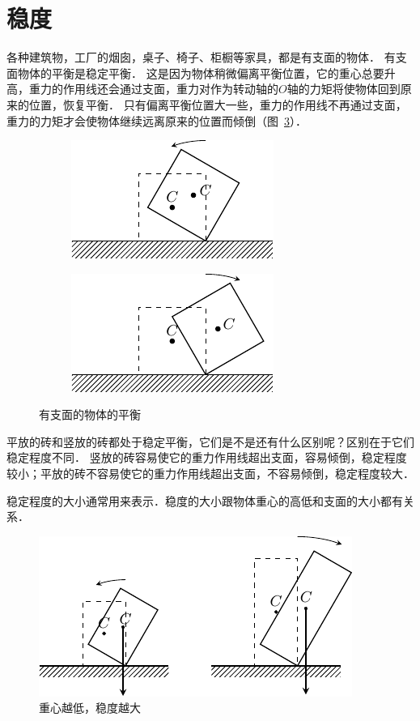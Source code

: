 \section{稳度}
各种建筑物，工厂的烟囱，桌子、椅子、柜橱等家具，都是有支面的物体．
有支面物体的平衡是稳定平衡．
这是因为物体稍微偏离平衡位置，它的重心总要升高，重力的作用线还会通过支面，重力对作为转动轴的$O$轴的力矩将使物体回到原来的位置，恢复平衡．
只有偏离平衡位置大一些，重力的作用线不再通过支面，重力的力矩才会使物体继续远离原来的位置而倾倒（图~\ref{fig_A_6-18}）．
\begin{figure}[htbp]
    \centering
    \begin{subfigure} {0.49\linewidth} 
        \centering
        \includegraphics{fig/A/6-18a.pdf} 
        \caption{}\label{fig_A_6-18a} 
    \end{subfigure}
    \begin{subfigure} {0.49\linewidth} 
        \centering
        \includegraphics{fig/A/6-18b.pdf} 
        \caption{}\label{fig_A_6-18b} 
    \end{subfigure}
    \caption{有支面的物体的平衡}\label{fig_A_6-18}
\end{figure}

平放的砖和竖放的砖都处于稳定平衡，它们是不是还有什么区别呢？区别在于它们稳定程度不同．
竖放的砖容易使它的重力作用线超出支面，容易倾倒，稳定程度较小；平放的砖不容易使它的重力作用线超出支面，不容易倾倒，稳定程度较大．

稳定程度的大小通常用来表示．稳度的大小跟物体重心的高低和支面的大小都有关系．
\begin{figure}[htbp]
	\centering
	\includegraphics{fig/A/6-19.pdf}
	\caption{重心越低，稳度越大}\label{fig_A_6-19}
\end{figure}

